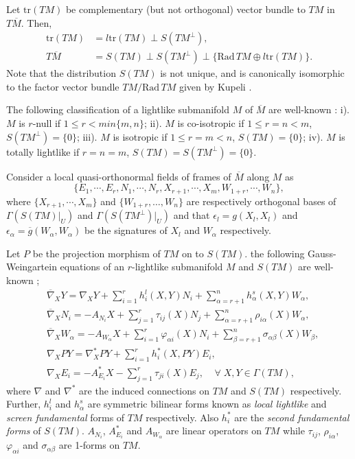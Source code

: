 \documentclass[reqno, 12pt]{amsart}
\numberwithin{equation}{section}
\begin{document}
Let $\mathrm{tr}(TM)$ be complementary (but not orthogonal) vector bundle to $TM$ in $T\overline{M}$. Then, 
\begin{align}
          \mathrm{tr}(TM)  & =l\mathrm{tr}(TM)\perp S(TM^\perp),\label{eq08}\\
  T\overline{M} &=  S(TM)\perp S(TM^\perp)\perp\{\mathrm{Rad}\, TM\oplus l\mathrm{tr}(TM)\}\label{eq04} .
\end{align}
Note that the distribution $S(TM)$ is not unique, and is canonically isomorphic to the factor vector bundle $TM/ \mathrm{Rad}\, TM$ given by Kupeli \cite{kup}. 
 
The following classification of  a lightlike submanifold $M$ of $\overline{M}$ are well-known \cite{db}: i). $M$ is $r$-null if $1\leq r< min\{m,n\}$; ii). $M$ is co-isotropic if $1\leq r=n<m$,  $S(TM^\perp)=\{0\}$; iii). $M$ is isotropic if $1\leq r=m<n$,  $S(TM)=\{0\}$; iv). $M$ is totally lightlike if $r=n=m$,  $S(TM)=S(TM^\perp)=\{0\}$.  

Consider a local quasi-orthonormal fields of frames of $\overline{M}$ along $M$ as 
\begin{equation*}
\{ E_1,\cdots, E_r,N_1,\cdots, N_r,X_{r+1},\cdots,X_{m},W_{1+r},\cdots, W_{n}\},
\end{equation*}
where
 $\{X_{r+1},\cdots,X_{m}\}$ and $\{W_{1+r},\ldots, W_n\}$ are respectively orthogonal bases of $\Gamma(S(TM)|_{U})$ and $\Gamma(S(TM^{\perp})|_{U})$  and that $\epsilon_l= g(X_{l},X_{l})$ and $\epsilon_\alpha=\overline{g}(W_\alpha,W_\alpha)$ be the signatures of $X_{l}$ and $W_\alpha$ respectively.
 
Let $P$ be the projection morphism of $TM$ on to $S(TM)$.  the following  Gauss-Weingartein equations  of an $r$-lightlike submanifold $M$ and $S(TM)$ are well-known \cite{ds2};
  \begin{align}
     & \overline{\nabla}_X Y=\nabla_X Y+\sum_{i=1}^r h_i^l(X,Y)N_i+\sum_{\alpha=r+1}^n h_\alpha^s(X,Y)W_\alpha,\label{eq11}\\
     & \overline{\nabla}_X N_i=-A_{N_i} X+\sum_{j=1}^r \tau_{ij}(X) N_j+\sum_{\alpha=r+1}^n \rho_{i\alpha}(X)W_\alpha,\label{eq31}\\
     & \overline{\nabla}_X W_\alpha=-A_{W_\alpha} X+\sum_{i=1}^r \varphi_{\alpha i}(X) N_i+\sum_{\beta=r+1}^n \sigma_{\alpha\beta}(X)W_\beta,\label{eq32}\\
     & \nabla_X P Y=\nabla_X^* PY+\sum_{i=1}^r h_i^*(X, P Y)E_i,\\
     & \nabla_X E_i=-A_{E_i}^* X-\sum_{j=1}^r \tau_{ji}(X) E_j,\;\;\;\; \forall\; X,Y\in \Gamma(TM)\label{eq50},
  \end{align}
where  $\nabla$ and $\nabla^*$ are the induced connections on $TM$ and $S(TM)$ respectively. Further, $h_i^l$ and $h_\alpha^s$ are symmetric bilinear forms known as \textit{local lightlike} and \textit{screen fundamental} forms of $TM$ respectively. Also $h_i^*$ are the \textit{ second fundamental forms} of $S(TM)$. $A_{N_i}$, $A_{E_i}^*$ and $A_{W_\alpha}$ are linear operators on $TM$ while $\tau_{ij}$, $\rho_{i\alpha}$, $\varphi_{\alpha i}$ and $\sigma_{\alpha\beta}$ are 1-forms on $TM$.  
\end{document}

